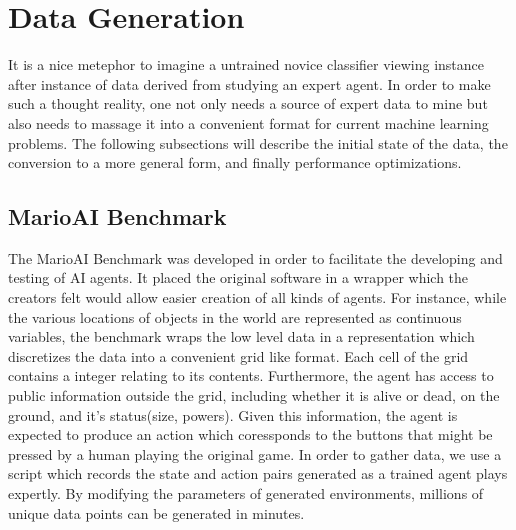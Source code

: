 \documentclass[]{article}   %
\begin{document}
\section{Data Generation}     %
\label{sec:datagen}
It is a nice metephor to imagine a untrained novice classifier viewing instance after instance of data derived from studying an expert agent.  In order to make such a thought reality, one not only needs a source of expert data to mine but also needs to massage it into a convenient format for current machine learning problems.  The following subsections will describe the initial state of the data, the conversion to a more general form, and finally performance optimizations.
\subsection{MarioAI Benchmark}
The MarioAI Benchmark \cite{mariobenchmark} was developed in order to facilitate the developing and testing of AI agents.  It placed the original software in a wrapper which the creators felt would allow easier creation of all kinds of agents.  For instance, while the various locations of objects in the world are represented as continuous variables, the benchmark wraps the low level data in a representation which discretizes the data into a convenient grid like format.  Each cell of the grid contains a integer relating to its contents.  Furthermore, the agent has access to public information outside the grid, including whether it is alive or dead, on the ground, and it's status(size, powers).  Given this information, the agent is expected to produce an action which coressponds to the buttons that might be pressed by a human playing the original game.  In order to gather data, we use a script which records the state and action pairs generated as a trained agent \cite{speed} plays expertly.  By modifying the parameters of generated environments, millions of unique data points can be generated in minutes.
\end{document}
